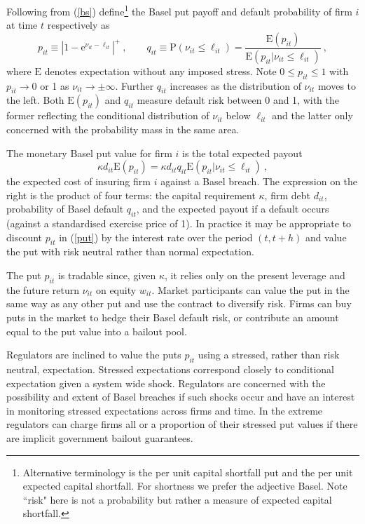 \documentclass[12pt]{article}
\newcommand{\E}{\mathrm{E}}
\newcommand{\p}{\mathrm{P}}
\newcommand{\e}{\mathrm{e}}
\newcommand{\eref}[1]{(\ref{#1})}
\newcommand{\cq}{\ , \qquad}
\newcommand{\be}[1]{\begin{equation}\label{#1}}
\newcommand{\ee}{\end{equation}}
\begin{document}
Following from \eref{bs}   define\footnote{Alternative terminology is the per unit capital shortfall put and the per unit expected capital shortfall.  For shortness we prefer the adjective Basel.  Note ``risk" here is not a probability but rather a measure of expected capital shortfall.} the  Basel put payoff and default probability of firm $i$ at time $t$ respectively as
\be{put}
p_{it}\equiv \left|1-\e^{\nu_{it}-\ell_{it}}\right|^+\cq q_{it}\equiv \p(\nu_{it}\le \ell_{it})=\frac{\E(p_{it})}{\E(p_{it}|\nu_{it}\le \ell_{it})}\ ,
\ee
where $\E$ denotes expectation without any imposed stress.  Note $0\le p_{it}\le 1$ with $p_{it}\rightarrow 0$ or 1 as $\nu_{it}\rightarrow\pm\infty$.
Further $q_{it}$ increases as the distribution of $\nu_{it}$ moves to the left.  Both $\E(p_{it})$ and $q_{it}$ measure default risk between 0 and 1, with the former reflecting the conditional distribution of $\nu_{it}$ below $\ell_{it}$ and the latter only concerned with the probability mass in the same area.


The monetary Basel put value  for firm  $i$ is the total expected payout
$$
\kappa d_{it}\E(p_{it}) = \kappa d_{it}q_{it}\E(p_{it}|\nu_{it}\le \ell_{it})\ ,
$$
the expected cost of insuring firm $i$ against a Basel breach.  The expression on the right is the product of four terms: the capital requirement $\kappa$, firm debt $d_{it}$, probability of Basel default $q_{it}$, and the expected payout if a default occurs (against a standardised exercise price of 1). In practice it may be appropriate to discount $p_{it}$ in \eref{put} by the interest rate over the period $(t,t+h)$ and value the put with risk neutral rather than normal expectation.

The put $p_{it}$ is tradable since, given $\kappa$, it relies only on the present leverage and the future return $\nu_{it}$ on equity $w_{it}$.  Market participants can value the put in  the same way as any other put and use the contract to diversify risk.  Firms can buy puts in the market to hedge their Basel default risk, or contribute an amount equal to the put value into a bailout pool.

Regulators are inclined to value the puts $p_{it}$ using a stressed, rather than risk neutral, expectation.   Stressed expectations correspond closely to conditional expectation given a system wide shock.    Regulators are concerned with the possibility and extent of Basel breaches if such shocks occur and  have an  interest in monitoring stressed expectations across firms and time.   In the extreme regulators can charge firms all or a  proportion of their stressed put values if there are implicit government bailout guarantees.
\end{document}
